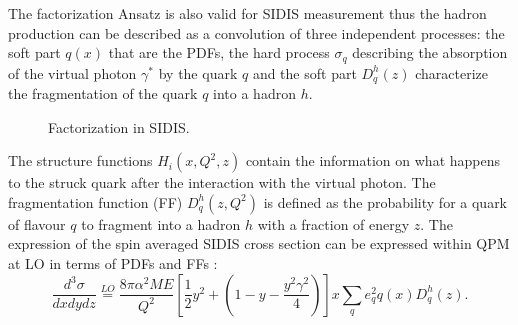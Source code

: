 The factorization Ansatz is also valid for SIDIS measurement thus the hadron production can be described as a convolution of three independent processes: the soft part $q(x)$ that are the PDFs, the hard process $\sigma_q$ describing the absorption of the virtual photon $\gamma^*$ by the quark $q$ and the soft part $D_q^h(z)$ characterize the fragmentation of the quark $q$ into a hadron $h$.

\begin{figure}[!h]
  \centering
	\caption{Factorization in SIDIS.}
	\label{pic:SIDIS}
\end{figure}

The structure functions $H_i(x,Q^2,z)$ contain the information on what happens to the struck quark after the interaction with the virtual photon. The fragmentation function (FF) $D_q^h(z,Q^2)$ is defined as the probability for a quark of flavour $q$ to fragment into a hadron $h$ with a fraction of energy $z$. The expression of the spin averaged SIDIS cross section can be expressed within QPM at LO in terms of PDFs and FFs \cite{BERGER,Panknin}:
%
\begin{equation}
  \frac{d^3 \sigma}{dxdydz} \stackrel{LO}{=} \frac{8\pi\alpha^2ME}{Q^2}\left[\frac{1}{2}y^2+\left(1-y-\frac{y^2 \gamma^2}{4}\right)\right]x\sum\limits_qe^2_qq(x)D_q^h(z).
  \label{eq:unpolSIDIS}
\end{equation}

